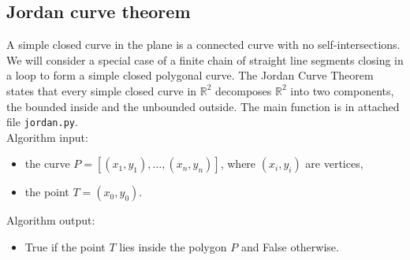 \documentclass[a4paper,11pt]{article}
\begin{document}
\subsection{Jordan curve theorem}

A simple closed curve in the plane is a connected curve with no self-intersections. 
We will consider a special case of a finite chain of straight line segments closing in a loop to form a simple closed polygonal curve.
The Jordan Curve Theorem states that every simple closed curve in $\mathbb{R}^2$ decomposes $\mathbb{R}^2$  into two components, 
the bounded inside and the unbounded outside.
The main function is in attached file \texttt{jordan.py}.
\\
Algorithm input:
\begin{itemize}
    \item the curve $P = [(x_1, y_1), \ldots, (x_n, y_n)]$, where $(x_i, y_i)$ are vertices,
    \item the point $T = (x_0, y_0)$.
\end{itemize}
Algorithm output:
\begin{itemize}
    \item True if the point $T$ lies inside the polygon $P$ and False otherwise.
\end{itemize}
\end{document}
